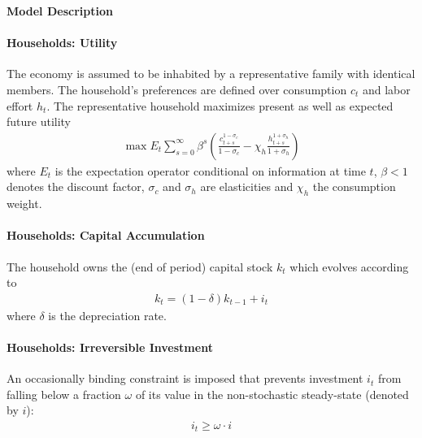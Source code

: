 \documentclass[a4paper]{scrartcl}
\begin{document}
\begin{center} \Large \textbf{Model Description} \end{center}

\paragraph{Households: Utility}
The economy is assumed to be inhabited by a representative family with identical members.
The household's preferences are defined over consumption \(c_t\) and labor effort \(h_t\).
The representative household maximizes present as well as expected future utility
\begin{align}
\max E_t \sum_{s=0}^{\infty} \beta^{s} \left( \frac{c_{t+s}^{1-\sigma_c}}{1-\sigma_c} - \chi_h \frac{h_{t+s}^{1+\sigma_h}}{1+\sigma_h} \right)\label{eq:RBCMonopIrrInv.UtilityLifetime}
\end{align}
where \(E_t\) is the expectation operator conditional on information at time \(t\),
  \(\beta <1\) denotes the discount factor,
  \(\sigma_c\) and \(\sigma_h\) are elasticities and \(\chi_h\) the consumption weight.

\paragraph{Households: Capital Accumulation}
The household owns the (end of period) capital stock \(k_t\) which evolves according to
\begin{align}
k_t = (1-\delta)k_{t-1} + i_t \label{eq:RBCMonopIrrInv.CapitalAccumulation}
\end{align}
where \(\delta \) is the depreciation rate.

\paragraph{Households: Irreversible Investment}
An occasionally binding constraint is imposed that prevents investment \(i_t\) from falling below a fraction \(\omega \)
  of its value in the non-stochastic steady-state (denoted by \(i\)):
\begin{align}
i_t \geq \omega \cdot i \label{eq:RBCMonopIrrInv.IrrInvest}
\end{align}
\end{document}

